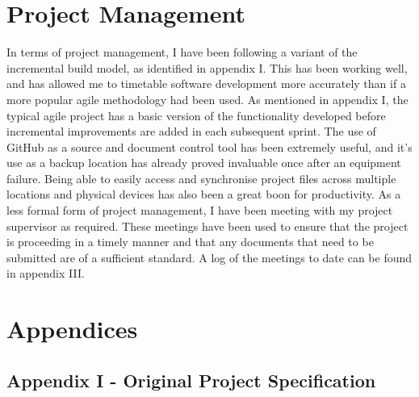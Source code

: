 \documentclass[10pt,a4paper]{report}
\begin{document}
\section*{Project Management}
In terms of project management, I have been following a variant of the incremental build model, as identified in appendix I. This has been working well, and has allowed me to timetable software development more accurately than if a more popular agile methodology had been used. As mentioned in appendix I, the typical agile project has a basic version of the functionality developed before incremental improvements are added in each subsequent sprint. The use of GitHub as a source and document control tool has been extremely useful, and it's use as a backup location has already proved invaluable once after an equipment failure. Being able to easily access and synchronise project files across multiple locations and physical devices has also been a great boon for productivity. As a less formal form of project management, I have been meeting with my project supervisor as required. These meetings have been used to ensure that the project is proceeding in a timely manner and that any documents that need to be submitted are of a sufficient standard. A log of the meetings to date can be found in appendix III.

\section*{Appendices}

\subsection*{Appendix I - Original Project Specification}

\end{document}

